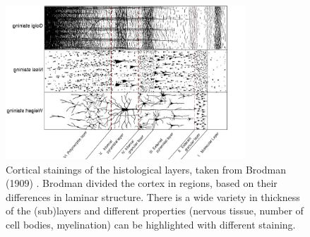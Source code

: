\begin{figure}[!ht]
	\centering
	\includegraphics[width=0.8\textwidth, clip=true]{./Chapters/01_Introduction/Images/Layers}
	\caption{Cortical stainings of the histological layers, taken from Brodman (1909) \cite{Brodmann1909}. Brodman divided the cortex in regions, based on their differences in laminar structure. There is a wide variety in thickness of the (sub)layers and different properties (nervous tissue, number of cell bodies, myelination) can be highlighted with different staining.}
	\label{fig:layers}
\end{figure}